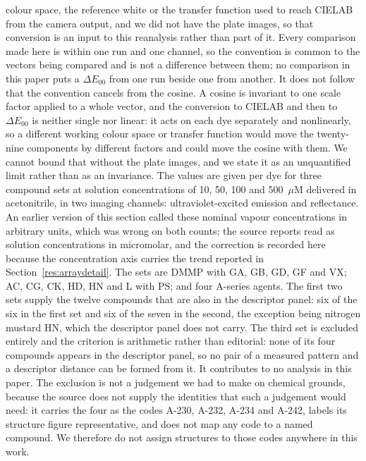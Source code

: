 \documentclass[journal=jacsat,manuscript=suppinfo,margin=1in]{achemso}
\begin{document}
colour space, the reference white or the transfer function used to reach
CIELAB from the camera output, and we did not have the plate images, so that
conversion is an input to this reanalysis rather than part of it. Every
comparison made here is within one run and one channel, so the convention is
common to the vectors being compared and is not a difference between them; no
comparison in this paper puts a $\Delta E_{00}$ from one run beside one from
another. It does not follow that the convention cancels from the cosine. A
cosine is invariant to one scale factor applied to a whole vector, and the
conversion to CIELAB and then to $\Delta E_{00}$ is neither single nor linear:
it acts on each dye separately and nonlinearly, so a different working colour
space or transfer function would move the twenty-nine components by different
factors and could move the cosine with them. We cannot bound that without the
plate images, and we state it as an unquantified limit rather than as an
invariance. The values are given per dye for three compound sets at
solution concentrations of 10, 50, 100 and 500~$\mu$M delivered in
acetonitrile, in two imaging channels: ultraviolet-excited emission and
reflectance. An earlier version of this section called these nominal vapour
concentrations in arbitrary units, which was wrong on both counts; the source
reports read as solution concentrations in micromolar, and the correction is
recorded here because the concentration axis carries the trend reported in
Section~\ref{res:arraydetail}. The sets are
DMMP with GA, GB, GD, GF and VX; AC, CG, CK, HD, HN and L with PS; and four
A-series agents. The first two sets supply the twelve compounds that are also in the descriptor
panel: six of the six in the first set and six of the seven in the second, the
exception being nitrogen mustard HN, which the descriptor panel does not carry.
The third set is excluded entirely and the criterion is arithmetic rather than
editorial: none of its four compounds appears in the descriptor panel, so no
pair of a measured pattern and a descriptor distance can be formed from it. It
contributes to no analysis in this paper. The exclusion is not a judgement we
had to make on chemical grounds, because the source does not supply the
identities that such a judgement would need: it carries the four as the codes
A-230, A-232, A-234 and A-242, labels its structure figure representative, and
does not map any code to a named compound\cite{group3ref}. We therefore do not
assign structures to those codes anywhere in this work.
\end{document}
